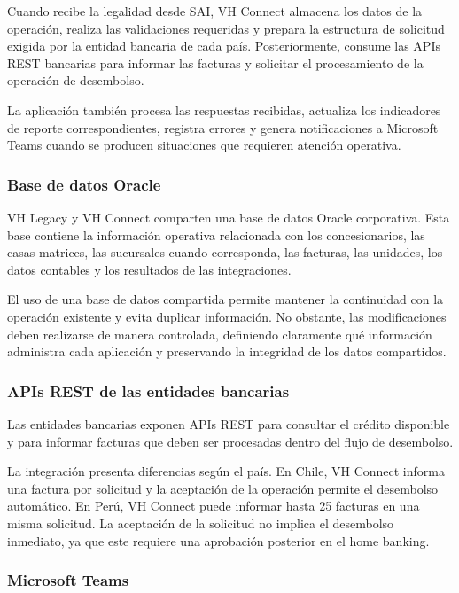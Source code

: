 Cuando recibe la legalidad desde SAI, VH Connect almacena los datos de la operación, realiza las validaciones requeridas y prepara la estructura de solicitud exigida por la entidad bancaria de cada país. Posteriormente, consume las APIs REST bancarias para informar las facturas y solicitar el procesamiento de la operación de desembolso.

La aplicación también procesa las respuestas recibidas, actualiza los indicadores de reporte correspondientes, registra errores y genera notificaciones a Microsoft Teams cuando se producen situaciones que requieren atención operativa.

\subsubsection{Base de datos Oracle}

VH Legacy y VH Connect comparten una base de datos Oracle corporativa. Esta base contiene la información operativa relacionada con los concesionarios, las casas matrices, las sucursales cuando corresponda, las facturas, las unidades, los datos contables y los resultados de las integraciones.

El uso de una base de datos compartida permite mantener la continuidad con la operación existente y evita duplicar información. No obstante, las modificaciones deben realizarse de manera controlada, definiendo claramente qué información administra cada aplicación y preservando la integridad de los datos compartidos.

\subsubsection{APIs REST de las entidades bancarias}

Las entidades bancarias exponen APIs REST para consultar el crédito disponible y para informar facturas que deben ser procesadas dentro del flujo de desembolso.

La integración presenta diferencias según el país. En Chile, VH Connect informa una factura por solicitud y la aceptación de la operación permite el desembolso automático. En Perú, VH Connect puede informar hasta 25 facturas en una misma solicitud. La aceptación de la solicitud no implica el desembolso inmediato, ya que este requiere una aprobación posterior en el home banking.

\subsubsection{Microsoft Teams}

